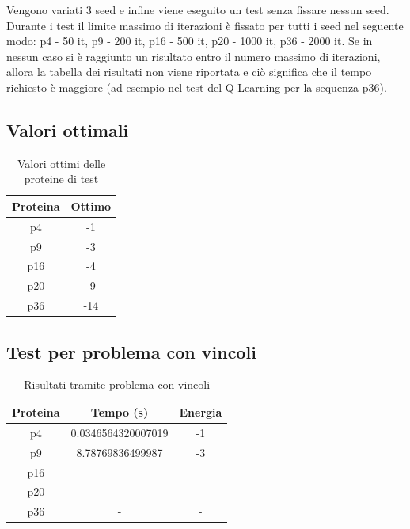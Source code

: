 \documentclass[conference]{IEEEtran}
\begin{document}
Vengono variati 3 seed e infine viene eseguito un test senza fissare nessun seed. Durante i test il limite massimo di iterazioni è fissato per tutti i seed nel seguente modo: p4 - 50 it, p9 - 200 it, p16 - 500 it, p20 - 1000 it, p36 - 2000 it. Se in nessun caso si è raggiunto un risultato entro il numero massimo di iterazioni, allora la tabella dei risultati non viene riportata e ciò significa che il tempo richiesto è maggiore (ad esempio nel test del Q-Learning per la sequenza p36).

\subsection{Valori ottimali}

\begin{table}[H]
\begin{center}
\begin{tabular}{|c|c|}
\hline
\textbf{Proteina} & \textbf{Ottimo} \\ \hline
p4 & -1 \\ \hline
p9 & -3 \\ \hline
p16 & -4 \\ \hline
p20 & -9 \\ \hline
p36 & -14 \\ \hline
\end{tabular}
\end{center}
\caption{Valori ottimi delle proteine di test}
\end{table}

\subsection{Test per problema con vincoli}

\begin{table}[H]
\begin{center}
\begin{tabular}{|c|c|c|}
\hline
\textbf{Proteina} & \textbf{Tempo (s)} & \textbf{Energia} \\ \hline
p4 & 0.0346564320007019 & -1 \\ \hline
p9 & 8.78769836499987 & -3 \\ \hline
p16 & - & - \\ \hline
p20 & - & - \\ \hline
p36 & - & - \\ \hline
\end{tabular}
\end{center}
\caption{Risultati tramite problema con vincoli}
\end{table}
\end{document}
